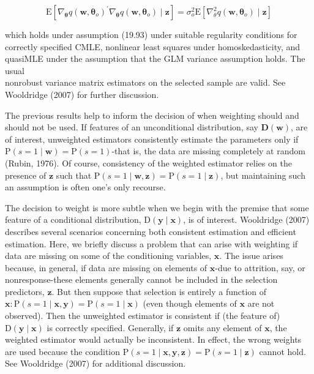 \documentclass[10pt]{article}
\begin{document}
\begin{equation*}
\mathrm{E}\left[\nabla_{\boldsymbol{\theta}} q\left(\mathbf{w}, \boldsymbol{\theta}_{o}\right)^{\prime} \nabla_{\boldsymbol{\theta}} q\left(\mathbf{w}, \boldsymbol{\theta}_{o}\right) \mid \mathbf{z}\right]=\sigma_{o}^{2} \mathrm{E}\left[\nabla_{\theta}^{2} q\left(\mathbf{w}, \boldsymbol{\theta}_{o}\right) \mid \mathbf{z}\right] \tag{19.94}
\end{equation*}


which holds under assumption (19.93) under suitable regularity conditions for correctly specified CMLE, nonlinear least squares under homoskedasticity, and quasiMLE under the assumption that the GLM variance assumption holds. The usual\\
nonrobust variance matrix estimators on the selected sample are valid. See Wooldridge (2007) for further discussion.

The previous results help to inform the decision of when weighting should and should not be used. If features of an unconditional distribution, say $\mathbf{D}(\mathbf{w})$, are of interest, unweighted estimators consistently estimate the parameters only if $\mathrm{P}(s=1 \mid \mathbf{w}) =\mathrm{P}(s=1)$-that is, the data are missing completely at random (Rubin, 1976). Of course, consistency of the weighted estimator relies on the presence of $\mathbf{z}$ such that $\mathrm{P}(s=1 \mid \mathbf{w}, \mathbf{z})=\mathrm{P}(s=1 \mid \mathbf{z})$, but maintaining such an assumption is often one's only recourse.

The decision to weight is more subtle when we begin with the premise that some feature of a conditional distribution, $\mathrm{D}(\mathbf{y} \mid \mathbf{x})$, is of interest. Wooldridge (2007) describes several scenarios concerning both consistent estimation and efficient estimation. Here, we briefly discuss a problem that can arise with weighting if data are missing on some of the conditioning variables, $\mathbf{x}$. The issue arises because, in general, if data are missing on elements of $\mathbf{x}$-due to attrition, say, or nonresponse-these elements generally cannot be included in the selection predictors, $\mathbf{z}$. But then suppose that selection is entirely a function of $\mathbf{x}: \mathrm{P}(s=1 \mid \mathbf{x}, \mathbf{y})=\mathrm{P}(s=1 \mid \mathbf{x})$ (even though elements of $\mathbf{x}$ are not observed). Then the unweighted estimator is consistent if (the feature of) $\mathrm{D}(\mathbf{y} \mid \mathbf{x})$ is correctly specified. Generally, if $\mathbf{z}$ omits any element of $\mathbf{x}$, the weighted estimator would actually be inconsistent. In effect, the wrong weights are used because the condition $\mathrm{P}(s=1 \mid \mathbf{x}, \mathbf{y}, \mathbf{z})=\mathrm{P}(s=1 \mid \mathbf{z})$ cannot hold. See Wooldridge (2007) for additional discussion.
\end{document}
